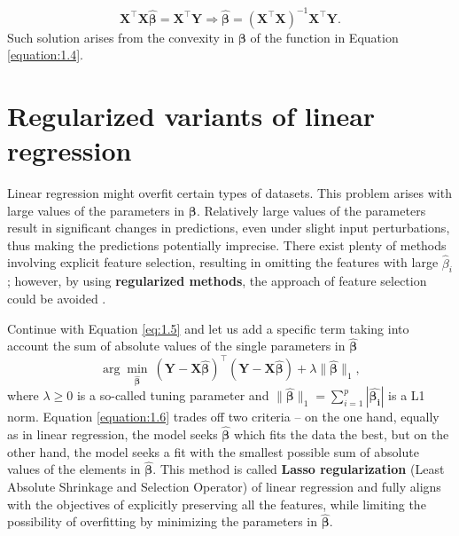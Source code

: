\begin{equation}
    \mathbf{X}^{\top}\mathbf{X}\bm{\hat{\beta}} = \mathbf{X}^{\top}\mathbf{Y} \Rightarrow \bm{\hat{\beta}} = (\mathbf{X}^{\top}\mathbf{X})^{-1}\mathbf{X}^{\top}\mathbf{Y}.
\end{equation}
Such solution arises from the convexity in $\mathbf{\beta}$ of the function in Equation \eqref{equation:1.4}.

\section{Regularized variants of linear regression}

Linear regression might overfit certain types of datasets. This problem arises with
large values of the parameters in $\bm{\beta}$. Relatively large values of the parameters result in significant changes in predictions, even under slight input perturbations, thus making the predictions potentially imprecise. There exist plenty of methods involving explicit feature selection, resulting
in omitting the features with large $\hat{\beta}_i$; however, by using \textbf{regularized methods}, the approach of feature selection could be avoided \cite{islp,skiena}.

Continue with Equation \eqref{eq:1.5} and let us add a specific term taking into account the sum of absolute values of the single parameters in $\bm{\hat{\beta}}$  
\begin{equation}
    \label{equation:1.6}
     \arg \min_{\bm{\hat{\beta}}} \> (\bm{Y} - \textbf{X}\bm{\hat{\beta}})^\top(\bm{Y} - \textbf{X}\bm{\hat{\beta}}) + \lambda \|\bm{\hat{\beta}}\|_1,
\end{equation}
where $\lambda \geq 0$ is a so-called tuning parameter and $\|\bm{\hat{\beta}}\|_1 = \sum_{i=1}^{p}|\bm{\hat{\beta_{i}}}|$ is a L1 norm. Equation \eqref{equation:1.6} trades off two criteria – on the one hand, equally as in linear regression, the model seeks
$\bm{\hat{\beta}}$ which fits the data the best, but on the other hand, the model seeks a fit with the smallest possible sum of absolute values of the elements in $\bm{\hat{\beta}}$.
This method is called \textbf{Lasso regularization} (Least Absolute Shrinkage and Selection Operator) of linear regression and fully aligns with the objectives of explicitly preserving all the features, while limiting the possibility of overfitting 
by minimizing the parameters in $\bm{\hat{\beta}}$.

